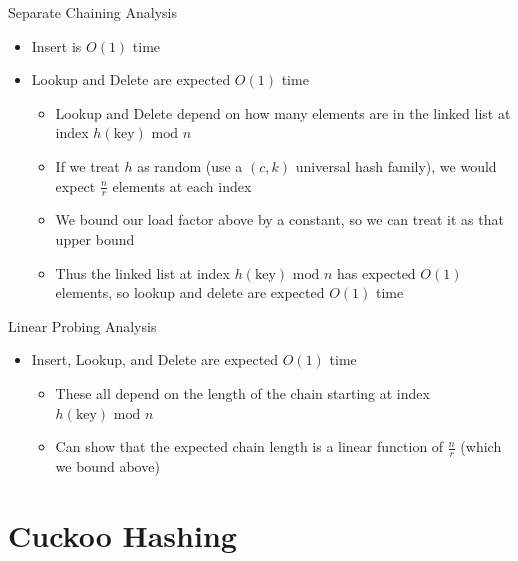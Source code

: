 \documentclass[aspectratio=169]{beamer}
\begin{document}
\begin{frame}{Separate Chaining Analysis}
    \begin{itemize}
        \item Insert is $O(1)$ time
        \item Lookup and Delete are expected $O(1)$ time \pause
        \begin{itemize}
            \item Lookup and Delete depend on how many elements are in the linked list at index $h(\text{key}) \text{ mod } n$
            \item If we treat $h$ as random (use a $(c, k)$ universal hash family), we would expect $\frac n r$ elements at each index \pause
            \item We bound our load factor above by a constant, so we can treat it as that upper bound
            \item Thus the linked list at index $h(\text{key}) \text{ mod } n$ has expected $O(1)$ elements, so lookup and delete are expected $O(1)$ time
        \end{itemize}
    \end{itemize}
\end{frame}

\begin{frame}{Linear Probing Analysis}
    \begin{itemize}
        \item Insert, Lookup, and Delete are expected $O(1)$ time \pause
        \begin{itemize}
            \item These all depend on the length of the chain starting at index $h(\text{key}) \text{ mod } n$
            \item Can show that the expected chain length is a linear function of $\frac n r$ (which we bound above)
        \end{itemize}
    \end{itemize}
\end{frame}

\section{Cuckoo Hashing}
\frame{\sectionpage}
\end{document}
